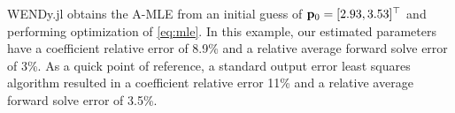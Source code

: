   WENDy.jl obtains the A-MLE from an initial guess of $\mathbf{p}_0 = [2.93, 3.53]^\top$ and performing optimization of \cref{eq:mle}. In this example, our estimated parameters have a coefficient relative error of 8.9\% and a relative average forward solve error of 3\%. As a quick point of reference, a standard output error least squares algorithm resulted in a coefficient relative error 11\% and a relative average forward solve error of 3.5\%. 
